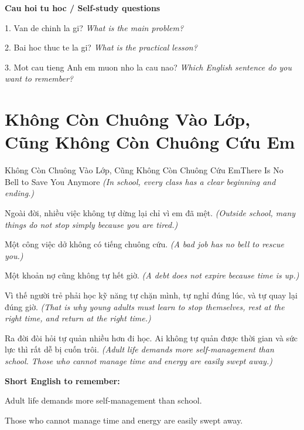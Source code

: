\begin{tuhocnhanh}
\textbf{Cau hoi tu hoc / Self-study questions}

1. Van de chinh la gi? \textit{What is the main problem?}

2. Bai hoc thuc te la gi? \textit{What is the practical lesson?}

3. Mot cau tieng Anh em muon nho la cau nao? \textit{Which English sentence do you want to remember?}
\end{tuhocnhanh}
\ngancach

\section{Không Còn Chuông Vào Lớp, Cũng Không Còn Chuông Cứu Em}
\begin{truyen}{Không Còn Chuông Vào Lớp, Cũng Không Còn Chuông Cứu Em}{There Is No Bell to Save You Anymore}
\textit{(In school, every class has a clear beginning and ending.)}

Ngoài đời, nhiều việc không tự dừng lại chỉ vì em đã mệt.
\textit{(Outside school, many things do not stop simply because you are tired.)}

Một công việc dở không có tiếng chuông cứu.
\textit{(A bad job has no bell to rescue you.)}

Một khoản nợ cũng không tự hết giờ.
\textit{(A debt does not expire because time is up.)}

Vì thế người trẻ phải học kỹ năng tự chặn mình, tự nghỉ đúng lúc, và tự quay lại đúng giờ.
\textit{(That is why young adults must learn to stop themselves, rest at the right time, and return at the right time.)}

\end{truyen}

\begin{baihoc}
Ra đời đòi hỏi tự quản nhiều hơn đi học. Ai không tự quản được thời gian và sức lực thì rất dễ bị cuốn trôi.
\textit{(Adult life demands more self-management than school. Those who cannot manage time and energy are easily swept away.)}
\end{baihoc}

\begin{ghinhoanh}
\textbf{Short English to remember:}

Adult life demands more self-management than school.

Those who cannot manage time and energy are easily swept away.

\end{ghinhoanh}


